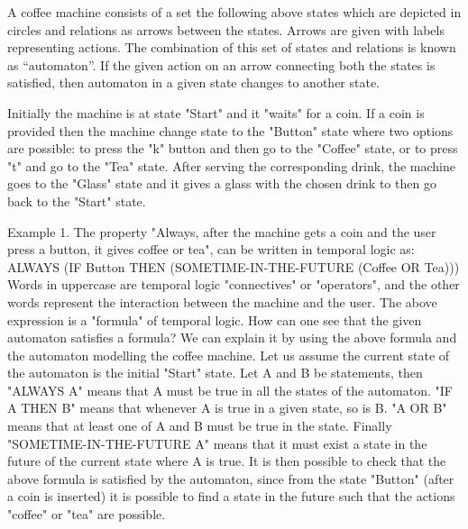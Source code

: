 \documentclass{article}
\begin{document}
  


A coffee machine consists of a set the following above states which are depicted in circles and relations as arrows between the states. Arrows are given with labels representing actions. The combination of this set of states and relations is known as “automaton”.  If the given action on an arrow connecting both the states is satisfied, then automaton in a given state changes to another state. 



Initially the machine is at state "Start" and it "waits" for a coin. If a coin is provided then the machine change state to the "Button" state where two options are possible: to press the "k" button and then go to the "Coffee" state, or to press "t" and go to the "Tea" state. After serving the corresponding drink, the machine goes to the "Glass" state and it gives a glass with the chosen drink to then go back to the "Start" state.


Example 1.
The property "Always, after the machine gets a coin and the user press a button, it gives coffee or tea", can be written in temporal logic as:
ALWAYS (IF Button THEN (SOMETIME-IN-THE-FUTURE (Coffee OR Tea)))
Words in uppercase are temporal logic "connectives" or "operators", and the other words represent the interaction between the machine and the user. The above expression is a "formula" of temporal logic.
How can one see that the given automaton satisfies a formula? We can explain it by using the above formula and the automaton modelling the coffee machine.
Let us assume the current state of the automaton is the initial "Start" state. Let A and B be statements, then "ALWAYS A" means that A must be true in all the states of the automaton. "IF A THEN B" means that whenever A is true in a given state, so is B. "A OR B" means that at least one of A and B must be true in the state. Finally "SOMETIME-IN-THE-FUTURE A" means that it must exist a state in the future of the current state where A is true.
It is then possible to check that the above formula is satisfied by the automaton, since from the state "Button" (after a coin is inserted) it is possible to find a state in the future such that the actions "coffee" or "tea" are possible.
\end{document}

